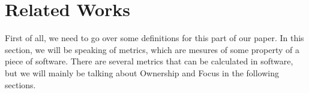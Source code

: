 \section{Related Works}

First of all, we need to go over some definitions for this part of our paper. In this section, we will be speaking of metrics, which are mesures of some property of a piece of software. There are several metrics that can be calculated in software, but we will mainly be talking about Ownership and Focus in the following sections.





